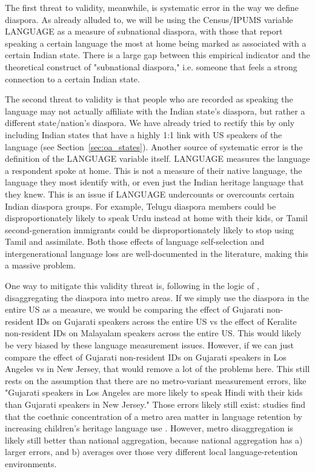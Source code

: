 \documentclass[12pt]{article}
\begin{document}
The first threat to validity, meanwhile, is systematic error in the way we define diaspora. As already alluded to, we will be using the Census/IPUMS variable LANGUAGE as a measure of subnational diaspora, with those that report speaking a certain language the most at home being marked as associated with a certain Indian state. There is a large gap between this empirical indicator and the theoretical construct of "subnational diaspora," i.e. someone that feels a strong connection to a certain Indian state.

The second threat to validity is that people who are recorded as speaking the language may not actually affiliate with the Indian state's diaspora, but rather a different state/nation's diaspora. We have already tried to rectify this by only including Indian states that have a highly 1:1 link with US speakers of the language (see Section~\ref{sec:oa_states}). Another source of systematic error is the definition of the LANGUAGE variable itself. LANGUAGE measures the language a respondent spoke at home. This is not a measure of their native language, the language they most identify with, or even just the Indian heritage language that they knew. This is an issue if LANGUAGE undercounts or overcounts certain Indian diaspora groups. For example, Telugu diaspora members could be disproportionately likely to speak Urdu instead at home with their kids, or Tamil second-generation immigrants could be disproportionately likely to stop using Tamil and assimilate. Both those effects of language self-selection and intergenerational language loss are well-documented in the literature, \citep{escobar_indian_2022} making this a massive problem.

One way to mitigate this validity threat is, following in the logic of \citet{mayda_refugees_2022}, disaggregating the diaspora into metro areas. If we simply use the diaspora in the entire US as a measure, we would be comparing the effect of Gujarati non-resident IDs on Gujarati speakers across the entire US vs the effect of Keralite non-resident IDs on Malayalam speakers across the entire US. This would likely be very biased by these language measurement issues. However, if we can just compare the effect of Gujarati non-resident IDs on Gujarati speakers in Los Angeles vs in New Jersey, that would remove a lot of the problems here. This still rests on the assumption that there are no metro-variant measurement errors, like "Gujarati speakers in Los Angeles are more likely to speak Hindi with their kids than Gujarati speakers in New Jersey." Those errors likely still exist: studies find that the coethnic concentration of a metro area matter in language retention by increasing children's heritage language use \citep{chondrogianni_heritage_2023, white_neighborhood_2017}. However, metro disaggregation is likely still better than national aggregation, because national aggregation has a) larger errors, and b) averages over those very different local language-retention environments. 
\end{document}
